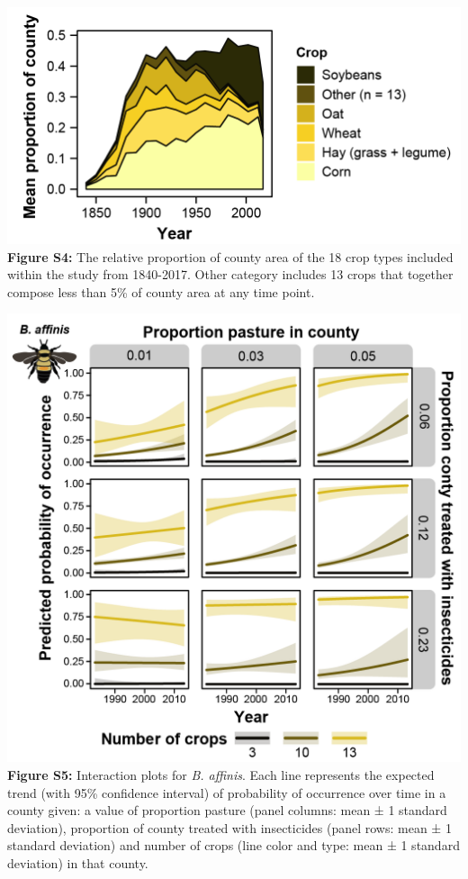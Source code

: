 \documentclass[11pt,]{article}
\begin{document}
\includegraphics[width=1\textwidth,height=\textheight]{../ms_figs/fig_s4.png}
\textbf{Figure S4:} The relative proportion of county area of the 18
crop types included within the study from 1840-2017. Other category
includes 13 crops that together compose less than 5\% of county area at
any time point. \clearpage

\newpage

\includegraphics[width=1\textwidth,height=\textheight]{../ms_figs/fig_s5.png}
\textbf{Figure S5:} Interaction plots for \emph{B. affinis}. Each line
represents the expected trend (with 95\% confidence interval) of
probability of occurrence over time in a county given: a value of
proportion pasture (panel columns: mean ± 1 standard deviation),
proportion of county treated with insecticides (panel rows: mean ± 1
standard deviation) and number of crops (line color and type: mean ± 1
standard deviation) in that county. \clearpage
\end{document}
